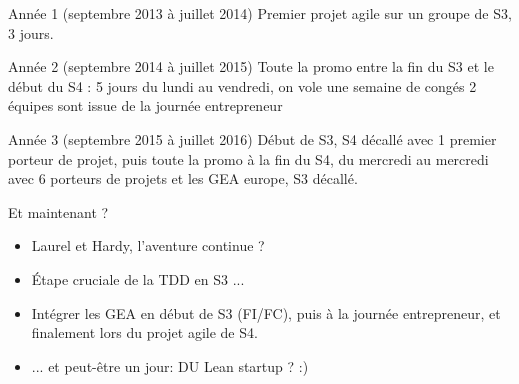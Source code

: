 \documentclass{beamer}
\begin{document}
\begin{frame}{Année 1 (septembre 2013 à juillet 2014)}
  Premier projet agile sur un groupe de S3, 3 jours. 
\end{frame}

\begin{frame}{Année 2 (septembre 2014 à juillet 2015)}
  Toute la promo entre la fin du S3 et le début du S4 : 5 jours du lundi au vendredi, on vole une semaine de congés
  2 équipes sont issue de la journée entrepreneur
\end{frame}

\begin{frame}{Année 3 (septembre 2015 à juillet 2016)}
  Début de S3, S4 décallé avec 1 premier porteur de projet, puis toute la promo à la fin du S4, du mercredi au mercredi avec 6 porteurs de projets et les GEA europe, S3 décallé.
\end{frame}

\begin{frame}{Et maintenant ?}
  \begin{itemize}
    \item Laurel et Hardy, l'aventure continue ?
    \item \'Etape cruciale de la TDD en S3 ...
    \item Intégrer les GEA en début de S3 (FI/FC), puis à la journée entrepreneur, et finalement lors du projet agile de S4. 
    \item ... et peut-être un jour: DU Lean startup ? :)
  \end{itemize}
\end{frame}
\end{document}
